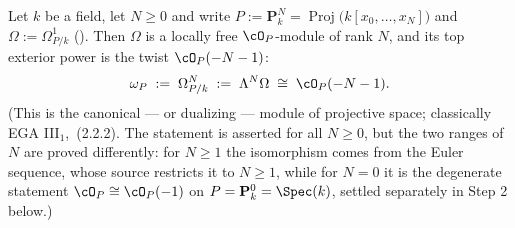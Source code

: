 \begin{lemma}
\label{lem:pc-omega-top-projective-space}
Let $k$ be a field, let $N\ge0$ and write
$P:=\mathbf P^N_k=\operatorname{Proj}\bigl(k[x_0,\dots,x_N]\bigr)$ and
$\Omega:=\Omega^1_{P/k}$ ().  Then
$\Omega$ is a locally free $\cO_P$-module of rank $N$, and its top
exterior power is the twist $\cO_P(-N-1)$:
\[
\omega_P\;:=\;\Omega^{N}_{P/k}\;:=\;\Lambda^{N}\Omega
\;\cong\;\cO_P(-N-1).
\]
(This is the canonical --- or dualizing --- module of projective space;
classically EGA III$_1$, \,(2.2.2).  The statement is asserted for all
$N\ge0$, but the two ranges of $N$ are proved differently: for $N\ge1$
the isomorphism comes from the Euler sequence, whose source restricts
it to $N\ge1$, while for $N=0$ it is the degenerate statement
$\cO_P\cong\cO_P(-1)$ on $P=\mathbf P^0_k=\Spec(k)$, settled
separately in Step 2 below.)
\end{lemma}

